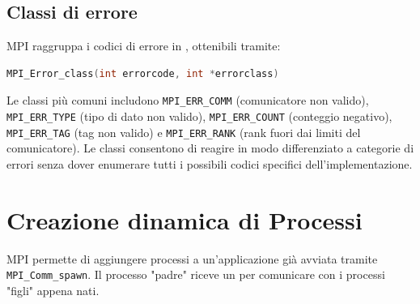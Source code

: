 \subsection{Classi di errore}
MPI raggruppa i codici di errore in , ottenibili tramite:
\begin{lstlisting}[language=C, numbers=none]
MPI_Error_class(int errorcode, int *errorclass)
\end{lstlisting}
Le classi più comuni includono \texttt{MPI\_ERR\_COMM} (comunicatore non valido), \texttt{MPI\_ERR\_TYPE} (tipo di dato non valido), \texttt{MPI\_ERR\_COUNT} (conteggio negativo), \texttt{MPI\_ERR\_TAG} (tag non valido) e \texttt{MPI\_ERR\_RANK} (rank fuori dai limiti del comunicatore). Le classi consentono di reagire in modo differenziato a categorie di errori senza dover enumerare tutti i possibili codici specifici dell'implementazione.

\section{Creazione dinamica di Processi} 
MPI permette di aggiungere processi a un'applicazione già avviata tramite \texttt{MPI\_Comm\_spawn}. Il processo "padre" riceve un  per comunicare con i processi "figli" appena nati.

